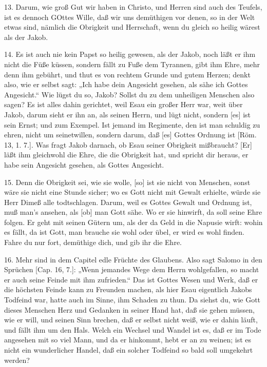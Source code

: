 13. Darum, wie groß Gut wir haben in Christo, und Herren sind auch des Teufels, ist es dennoch GOttes Wille, daß wir uns demüthigen vor denen, so in der Welt etwas sind,
nämlich die Obrigkeit und Herrschaft, wenn du gleich so heilig wärest als der Jakob.

14. Es ist auch nie kein Papst so heilig gewesen, als der Jakob, noch läßt er ihm nicht die Füße küssen, sondern fällt zu Fuße dem Tyrannen, gibt ihm Ehre, mehr denn ihm gebührt, und thut es von rechtem Grunde und gutem Herzen; denkt also, wie er selbst sagt: „Ich habe dein Angesicht gesehen, als sähe ich Gottes Angesicht.“ Wie lügst du so, Jakob? Sollst du zu dem unheiligen Menschen also sagen? Es ist alles dahin gerichtet, weil Esau ein großer Herr war, weit über Jakob, darum sieht er ihn an, als seinen Herrn, und lügt nicht, sondern [es] ist sein Ernst; und zum Exempel. Ist jemand im Regimente, den ist man schuldig zu ehren, nicht um seinetwillen, sondern darum, daß [es] Gottes Ordnung ist [Röm. 13, 1. 7.]. Was fragt Jakob darnach, ob Esau seiner Obrigkeit mißbraucht? [Er] läßt ihm gleichwohl die Ehre, die die Obrigkeit hat, und spricht dir heraus, er habe sein Angesicht gesehen, als Gottes Angesicht.

15. Denn die Obrigkeit sei, wie sie wolle, [so] ist sie nicht von Menschen, sonst wäre sie nicht eine Stunde sicher; wo es Gott nicht mit Gewalt erhielte, würde sie Herr Dimeß alle todtschlagen. Darum, weil es Gottes Gewalt und Ordnung ist, muß man’s ansehen, als [ob] man Gott sähe. Wo er sie hinwirft, da soll seine Ehre folgen. Er geht mit seinen Gütern um, als der da Geld in die Napusie wirft: wohin es fällt, da ist Gott, man brauche sie wohl oder übel, er wird es wohl finden. Fahre du nur fort, demüthige dich, und gib ihr die Ehre.

16. Mehr sind in dem Capitel edle Früchte des Glaubens. Also sagt Salomo in den Sprüchen [Cap. 16, 7.]: „Wenn jemandes Wege dem Herrn wohlgefallen, so macht er auch seine Feinde mit ihm zufrieden.“ Das ist Gottes Wesen und Werk, daß er die höchsten Feinde kann zu Freunden machen, als hier Esau eigentlich Jakobs Todfeind war, hatte auch im Sinne, ihm Schaden zu thun. Da siehst du, wie Gott dieses Menschen Herz und Gedanken in seiner Hand hat, daß sie gehen müssen, wie er will, und seinen Sinn brechen, daß er selbst nicht weiß, wie er dahin läuft, und fällt ihm um den Hals. Welch ein Wechsel und Wandel ist es, daß er im Tode angesehen mit so viel Mann, und da er hinkommt, hebt er an zu weinen; ist es nicht ein wunderlicher Handel, daß ein solcher Todfeind so bald soll umgekehrt werden?

